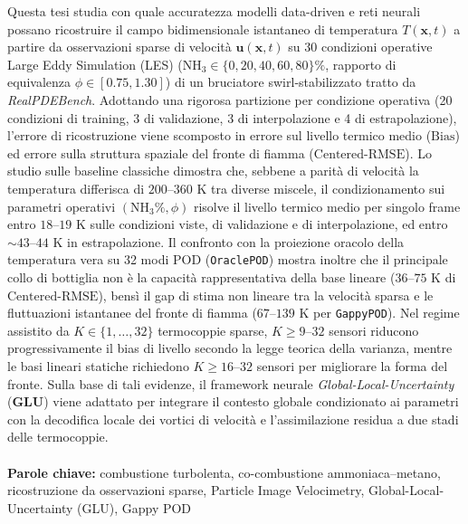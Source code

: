\documentclass{Configuration_Files/PoliMi3i_thesis}
\begin{document}
Questa tesi studia con quale accuratezza modelli data-driven e reti neurali possano ricostruire il campo bidimensionale istantaneo di temperatura $T(\mathbf{x}, t)$ a partire da osservazioni sparse di velocità $\mathbf{u}(\mathbf{x}, t)$ su 30 condizioni operative Large Eddy Simulation (LES) ($\text{NH}_3 \in \{0, 20, 40, 60, 80\}\%$, rapporto di equivalenza $\phi \in [0.75, 1.30]$) di un bruciatore swirl-stabilizzato tratto da \textit{RealPDEBench}. Adottando una rigorosa partizione per condizione operativa (20 condizioni di training, 3 di validazione, 3 di interpolazione e 4 di estrapolazione), l'errore di ricostruzione viene scomposto in errore sul livello termico medio ($\text{Bias}$) ed errore sulla struttura spaziale del fronte di fiamma ($\text{Centered-RMSE}$). Lo studio sulle baseline classiche dimostra che, sebbene a parità di velocità la temperatura differisca di $200\text{--}360\text{ K}$ tra diverse miscele, il condizionamento sui parametri operativi $(\text{NH}_3\%, \phi)$ risolve il livello termico medio per singolo frame entro $18\text{--}19\text{ K}$ sulle condizioni viste, di validazione e di interpolazione, ed entro $\sim 43\text{--}44\text{ K}$ in estrapolazione. Il confronto con la proiezione oracolo della temperatura vera su 32 modi POD (\texttt{OraclePOD}) mostra inoltre che il principale collo di bottiglia non è la capacità rappresentativa della base lineare ($36\text{--}75\text{ K}$ di $\text{Centered-RMSE}$), bensì il gap di stima non lineare tra la velocità sparsa e le fluttuazioni istantanee del fronte di fiamma ($67\text{--}139\text{ K}$ per \texttt{GappyPOD}). Nel regime assistito da $K \in \{1, \dots, 32\}$ termocoppie sparse, $K \ge 9\text{--}32$ sensori riducono progressivamente il bias di livello secondo la legge teorica della varianza, mentre le basi lineari statiche richiedono $K \ge 16\text{--}32$ sensori per migliorare la forma del fronte. Sulla base di tali evidenze, il framework neurale \textit{Global-Local-Uncertainty} (\textbf{GLU}) viene adattato per integrare il contesto globale condizionato ai parametri con la decodifica locale dei vortici di velocità e l'assimilazione residua a due stadi delle termocoppie.
\\
\\
\textbf{Parole chiave:} combustione turbolenta, co-combustione ammoniaca--metano, ricostruzione da osservazioni sparse, Particle Image Velocimetry, Global-Local-Uncertainty (GLU), Gappy POD

\thispagestyle{empty}
\tableofcontents
\thispagestyle{empty}
\cleardoublepage
\end{document}
